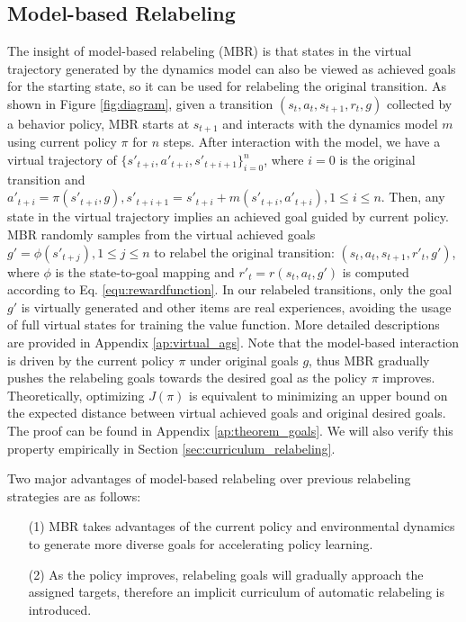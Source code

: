 \documentclass{article}
\begin{document}
\subsection{Model-based Relabeling}
\label{sec:MBR}
The insight of model-based relabeling (MBR) is that states in the virtual trajectory generated by the dynamics model can also be viewed as achieved goals for the starting state, so it can be used for relabeling the original transition. As shown in Figure \ref{fig:diagram}, given a transition $(s_t, a_t, s_{t+1}, r_t, g)$ collected by a behavior policy, MBR starts at $s_{t+1}$ and interacts with the dynamics model $m$ using current policy $\pi$ for $n$ steps. After interaction with the model, we have a virtual trajectory of $\{s'_{t+i}, a'_{t+i}, s'_{t+i+1}\}_{i=0}^{n}$, where $i=0$ is the original transition and $a'_{t+i}=\pi(s'_{t+i},g), s'_{t+i+1}=s'_{t+i} + m(s'_{t+i}, a'_{t+i}), 1 \leq i\leq n$. Then, any state in the virtual trajectory implies an achieved goal guided by current policy. MBR randomly samples from the virtual achieved goals $g'=\phi(s'_{t+j}), 1 \leq j \leq n$ to relabel the original transition: $(s_t, a_t, s_{t+1}, r'_t, g')$, where $\phi$ is the state-to-goal mapping and $r'_t=r(s_t,a_t,g')$ is computed according to Eq. \eqref{equ:rewardfunction}. In our relabeled transitions, only the goal $g'$ is virtually generated and other items are real experiences, avoiding the usage of full virtual states for training the value function. More detailed descriptions are provided in Appendix \ref{ap:virtual_ags}. Note that the model-based interaction is driven by the current policy $\pi$ under original goals $g$, thus MBR gradually pushes the relabeling goals towards the desired goal as the policy $\pi$ improves. Theoretically, optimizing $J(\pi)$ is equivalent to minimizing an upper bound on the expected distance between virtual achieved goals and original desired goals. The proof can be found in Appendix \ref{ap:theorem_goals}. We will also verify this property empirically in Section \ref{sec:curriculum_relabeling}. 

Two major advantages of model-based relabeling over previous relabeling strategies are as follows: 
\begin{itemize}
    \item[(1)] MBR takes advantages of the current policy and environmental dynamics to generate more diverse goals for accelerating policy learning.
    \item[(2)] As the policy improves, relabeling goals will gradually approach the assigned targets, therefore an implicit curriculum of automatic relabeling is introduced.
\end{itemize}
\end{document}
